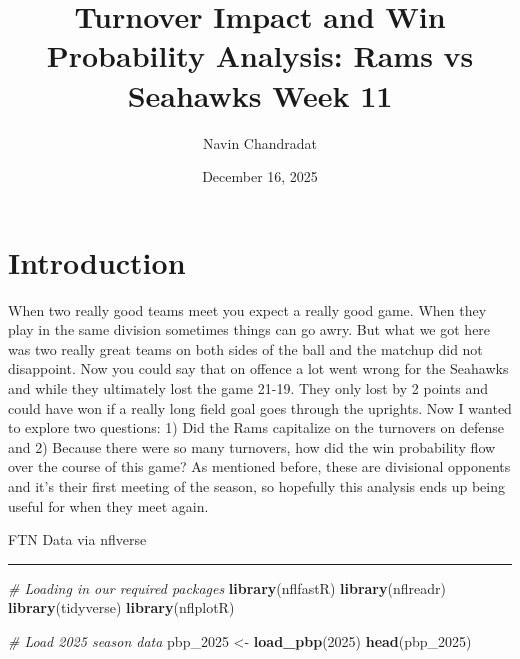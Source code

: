 \documentclass[
]{article}
\title{Turnover Impact and Win Probability Analysis: Rams vs Seahawks
Week 11}
\author{Navin Chandradat}
\date{December 16, 2025}
\newenvironment{Shaded}{\begin{snugshade}}{\end{snugshade}}
\newcommand{\CommentTok}[1]{\textcolor[rgb]{0.56,0.35,0.01}{\textit{#1}}}
\newcommand{\DecValTok}[1]{\textcolor[rgb]{0.00,0.00,0.81}{#1}}
\newcommand{\FunctionTok}[1]{\textcolor[rgb]{0.13,0.29,0.53}{\textbf{#1}}}
\newcommand{\NormalTok}[1]{#1}
\newcommand{\OtherTok}[1]{\textcolor[rgb]{0.56,0.35,0.01}{#1}}
\begin{document}
\maketitle

{
\setcounter{tocdepth}{2}
\tableofcontents
}
\section{Introduction}\label{introduction}

When two really good teams meet you expect a really good game. When they
play in the same division sometimes things can go awry. But what we got
here was two really great teams on both sides of the ball and the
matchup did not disappoint. Now you could say that on offence a lot went
wrong for the Seahawks and while they ultimately lost the game 21-19.
They only lost by 2 points and could have won if a really long field
goal goes through the uprights. Now I wanted to explore two questions:
1) Did the Rams capitalize on the turnovers on defense and 2) Because
there were so many turnovers, how did the win probability flow over the
course of this game? As mentioned before, these are divisional opponents
and it's their first meeting of the season, so hopefully this analysis
ends up being useful for when they meet again.

FTN Data via nflverse

\begin{center}\rule{0.5\linewidth}{0.5pt}\end{center}

\begin{Shaded}
\begin{Highlighting}[]
\CommentTok{\# Loading in our required packages}
\FunctionTok{library}\NormalTok{(nflfastR)}
\FunctionTok{library}\NormalTok{(nflreadr)}
\FunctionTok{library}\NormalTok{(tidyverse)}
\FunctionTok{library}\NormalTok{(nflplotR)}
\end{Highlighting}
\end{Shaded}

\begin{Shaded}
\begin{Highlighting}[]
\CommentTok{\# Load 2025 season data}
\NormalTok{pbp\_2025 }\OtherTok{\textless{}{-}} \FunctionTok{load\_pbp}\NormalTok{(}\DecValTok{2025}\NormalTok{)}
\FunctionTok{head}\NormalTok{(pbp\_2025)}
\end{Highlighting}
\end{Shaded}
\end{document}
